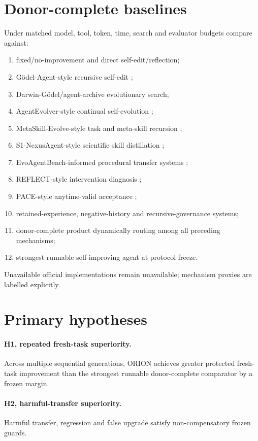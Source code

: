 \documentclass[11pt]{article}
\begin{document}
\section{Donor-complete baselines}
Under matched model, tool, token, time, search and evaluator budgets compare against:
\begin{enumerate}
    \item fixed/no-improvement and direct self-edit/reflection;
    \item G\"odel-Agent-style recursive self-edit \cite{godel2025};
    \item Darwin-G\"odel/agent-archive evolutionary search;
    \item AgentEvolver-style continual self-evolution \cite{agentevolver2025};
    \item MetaSkill-Evolve-style task and meta-skill recursion \cite{metaskill2026};
    \item S1-NexusAgent-style scientific skill distillation \cite{nexus2026};
    \item EvoAgentBench-informed procedural transfer systems \cite{evoagentbench2026};
    \item REFLECT-style intervention diagnosis \cite{reflect2026};
    \item PACE-style anytime-valid acceptance \cite{pace2026};
    \item retained-experience, negative-history and recursive-governance systems;
    \item donor-complete product dynamically routing among all preceding mechanisms;
    \item strongest runnable self-improving agent at protocol freeze.
\end{enumerate}
Unavailable official implementations remain unavailable; mechanism proxies are labelled explicitly.

\section{Primary hypotheses}
\paragraph{H1, repeated fresh-task superiority.} Across multiple sequential generations, ORION achieves greater protected fresh-task improvement than the strongest runnable donor-complete comparator by a frozen margin.

\paragraph{H2, harmful-transfer superiority.} Harmful transfer, regression and false upgrade satisfy non-compensatory frozen guards.
\end{document}
